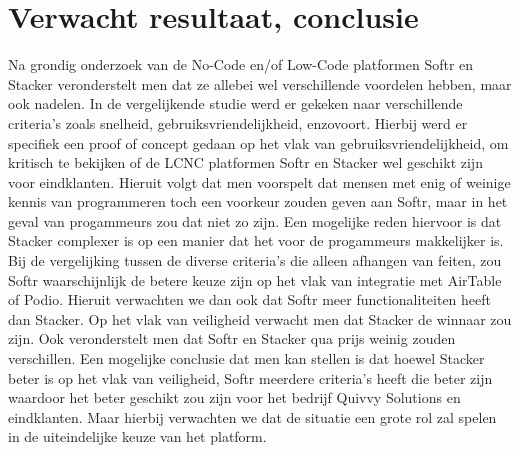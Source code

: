 \section{Verwacht resultaat, conclusie}%
\label{sec:verwachte_resultaten}
Na grondig onderzoek van de No-Code en/of Low-Code platformen Softr en Stacker veronderstelt men dat ze allebei wel verschillende voordelen hebben, maar ook nadelen.
In de vergelijkende studie werd er gekeken naar verschillende criteria's zoals snelheid, gebruiksvriendelijkheid, enzovoort. Hierbij werd er specifiek een proof of concept gedaan op het vlak van gebruiksvriendelijkheid, om kritisch te bekijken of de LCNC platformen Softr en Stacker wel geschikt zijn voor eindklanten.
Hieruit volgt dat men voorspelt dat mensen met enig of weinige kennis van programmeren toch een voorkeur zouden geven aan Softr, maar in het geval van progammeurs zou dat niet zo zijn. Een mogelijke reden hiervoor is dat Stacker complexer is op een manier dat het voor de progammeurs makkelijker is.
Bij de vergelijking tussen de diverse criteria's die alleen afhangen van feiten, zou Softr waarschijnlijk de betere keuze zijn op het vlak van integratie met AirTable of Podio. Hieruit verwachten we dan ook dat Softr meer functionaliteiten heeft dan Stacker. Op het vlak van veiligheid verwacht men dat Stacker de winnaar zou zijn.
Ook veronderstelt men dat Softr en Stacker qua prijs weinig zouden verschillen. Een mogelijke conclusie dat men kan stellen is dat hoewel Stacker beter is op het vlak van veiligheid, Softr meerdere criteria's heeft die beter zijn waardoor het beter geschikt zou zijn voor het bedrijf Quivvy Solutions en eindklanten.
Maar hierbij verwachten we dat de situatie een grote rol zal spelen in de uiteindelijke keuze van het platform.


